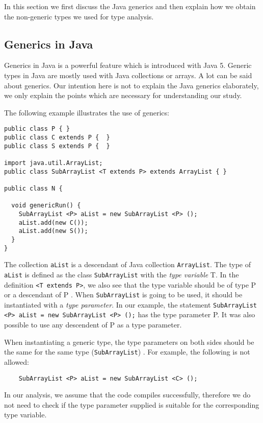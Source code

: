 \documentclass{uvamscse}
\begin{document}
In this section we first discuss the Java generics and then explain how we obtain the non-generic types we used for type analysis.

\subsection{Generics in Java} \label{JavaGenerics}
Generics in Java is a powerful feature which is introduced with Java 5. Generic types in Java are mostly used with Java collections or arrays. A lot can be said about generics. Our intention here is not to explain the Java generics elaborately, we only explain the points which are necessary for understanding our study. 

 The following example illustrates the use of generics:
\begin{verbatim}
public class P { }
public class C extends P {  }
public class S extends P {  }

import java.util.ArrayList;
public class SubArrayList <T extends P> extends ArrayList { }

public class N {
  
  void genericRun() {
   	SubArrayList <P> aList = new SubArrayList <P> ();
    aList.add(new C());
    aList.add(new S());
  }
}
\end{verbatim}

The collection \texttt{aList} is a descendant of Java collection \texttt{ArrayList}. The type of \texttt{aList} is defined as the class \texttt{SubArrayList} with the \emph{type variable} T. In the definition \texttt{<T extends P>}, we also see that the type variable should be of type P or a descendant of P . When \texttt{SubArrayList} is going to be used, it should be instantiated with a \emph{type parameter}. In our example, the statement \texttt{SubArrayList <P> aList = new SubArrayList <P> ();}  has the type parameter P. It was also possible to use any descendent of P as a type parameter.

When instantiating a generic type, the type parameters on both sides should be the same for the same type (\texttt{SubArrayList}) . For example, the following is not allowed: 
\begin{verbatim}
    SubArrayList <P> aList = new SubArrayList <C> ();
\end{verbatim}

In our analysis, we assume that the code compiles successfully, therefore we do not need to check if the type parameter supplied  is suitable for the corresponding type variable.
\end{document}
